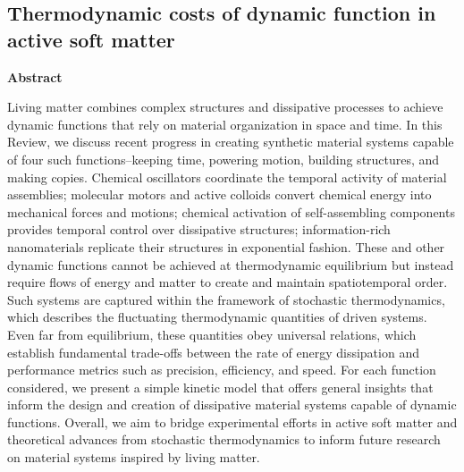 %


\begin{appendices}



\chapter{Thermodynamic costs of dynamic function in active soft matter}

\begin{center}
\textbf{Abstract}
\end{center}

Living matter combines complex structures and dissipative processes to achieve dynamic functions that rely on material organization in space and time. In this Review, we discuss recent progress in creating synthetic material systems capable of four such functions–keeping time, powering motion, building structures, and making copies. Chemical oscillators coordinate the temporal activity of material assemblies; molecular motors and active colloids convert chemical energy into mechanical forces and motions; chemical activation of self-assembling components provides temporal control over dissipative structures; information-rich nanomaterials replicate their structures in exponential fashion. These and other dynamic functions cannot be achieved at thermodynamic equilibrium but instead require flows of energy and matter to create and maintain spatiotemporal order. Such systems are captured within the framework of stochastic thermodynamics, which describes the fluctuating thermodynamic quantities of driven systems. Even far from equilibrium, these quantities obey universal relations, which establish fundamental trade-offs between the rate of energy dissipation and performance metrics such as precision, efficiency, and speed. For each function considered, we present a simple kinetic model that offers general insights that inform the design and creation of dissipative material systems capable of dynamic functions. Overall, we aim to bridge experimental efforts in active soft matter and theoretical advances from stochastic thermodynamics to inform future research on material systems inspired by living matter.




\end{appendices}
